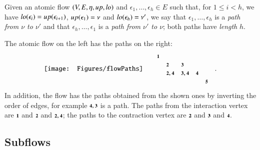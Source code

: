 \begin{definition}\label{definition:FlowPaths}
Given an atomic flow $(V,E,\eta,{\mathit up},{\mathit lo})$ and $\epsilon_1,\dots,\epsilon_h\in E$ such that, for $1\le i<h$, we have ${\mathit lo}(\epsilon_i)={\mathit up}(\epsilon_{i+1})$, ${\mathit up}(\epsilon_1)=\nu$ and ${\mathit lo}(\epsilon_h)=\nu'$, we say that $\epsilon_1,\dots,\epsilon_h$ is a \emph{path from $\nu$ to $\nu'$} and that $\epsilon_h,\dots,\epsilon_1$ is a \emph{path from $\nu'$ to $\nu$}; both paths have \emph{length} $h$.
\end{definition}

\begin{example}\label{example:Paths}
The atomic flow on the left has the paths on the right:
\[
\begin{array}{@{}c@{}c@{}}
\vcenter{\hbox{\texttt{[image: Figures/flowPaths]}}}
\qquad&
\begin{array}{@{}lllll@{}}
\one                 &                &                  &           &       \\
                     &\two            &\three            &           &       \\
                     &\two,\four      &\three,\four      &\four      &       \\
                     &                &                  &           &\five  \\
\end{array}\quad.
\\
\end{array}
\]
In addition, the flow has the paths obtained from the shown ones by inverting the order of edges, for example $\four,\three$ is a path. The paths from the interaction vertex are $\one$ and $\two$ and $\two,\four$; the paths to the contraction vertex are $\two$ and $\three$ and $\four$.
\end{example}

\subsection{Subflows}\label{subsection:Subflows}


